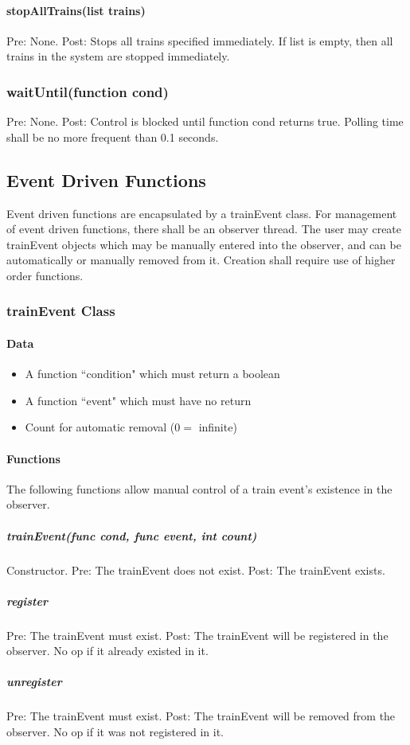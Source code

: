 \documentclass[a4paper,11pt,notitlepage]{article}
\begin{document}
\paragraph{stopAllTrains(list trains)} Pre: None. Post: Stops all trains specified immediately. If list is empty, then all trains in the system are stopped immediately.
\subsubsection{waitUntil(function cond)} Pre: None. Post: Control is blocked until function cond returns true. Polling time shall be no more frequent than 0.1 seconds.

\subsection{Event Driven Functions}
Event driven functions are encapsulated by a trainEvent class. For management of event driven functions, there shall be an observer thread. The user may create trainEvent objects which may be manually entered into the observer, and can be automatically or manually removed from it. Creation shall require use of higher order functions.
\subsubsection{trainEvent Class}
\paragraph{Data}
\begin{itemize}
\item A function ``condition" which must return a boolean
\item A function ``event" which must have no return
\item Count for automatic removal ($0 =$ infinite)
\end{itemize}
\paragraph{Functions}
The following functions allow manual control of a train event's existence in the observer.
\subparagraph{trainEvent(func cond, func event, int count)} Constructor. Pre: The trainEvent does not exist. Post: The trainEvent exists.
\subparagraph{register} Pre: The trainEvent must exist. Post: The trainEvent will be registered in the observer. No op if it already existed in it.
\subparagraph{unregister} Pre: The trainEvent must exist. Post: The trainEvent will be removed from the observer. No op if it was not registered in it.
\end{document}
